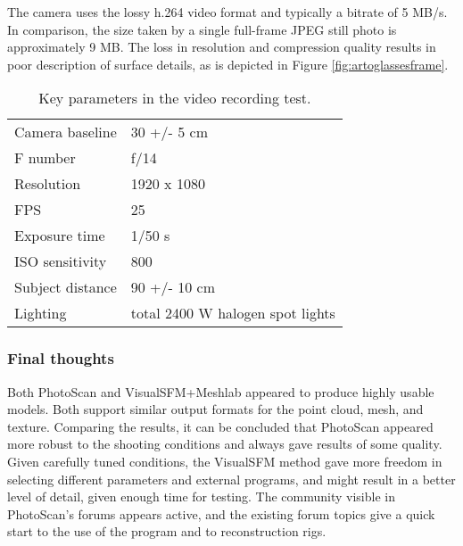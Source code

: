 The camera uses the lossy h.264 video format and typically a bitrate of 5 MB/s.
In comparison, the size taken by a single full-frame JPEG still photo is approximately 9 MB.
The loss in resolution and compression quality results in poor description of surface details, as is depicted in Figure \ref{fig:artoglassesframe}.

\begin{table}[t]
	\centering
	\begin{tabular}{l l}
		Camera baseline & 30 +/- 5 cm\\
		F number & f/14\\
		Resolution & 1920 x 1080\\
		FPS & 25\\
		Exposure time & 1/50 s\\
		ISO sensitivity & 800\\
		Subject distance & 90 +/- 10 cm\\
		Lighting & total 2400 W halogen spot lights\\
	\end{tabular}
	\caption{
		Key parameters in the video recording test.
	}
	\label{tab:samplevideoparams}
\end{table}




\subsubsection{Final thoughts}

Both PhotoScan and VisualSFM+Meshlab appeared to produce highly usable models.
Both support similar output formats for the point cloud, mesh, and texture.
Comparing the results, it can be concluded that PhotoScan appeared more robust to the shooting conditions and always gave results of some quality.
Given carefully tuned conditions, the VisualSFM method gave more freedom in selecting different parameters and external programs, and might result in a better level of detail, given enough time for testing.
The community visible in PhotoScan's forums \cite{agisoftforum} appears active, and the existing forum topics give a quick start to the use of the program and to reconstruction rigs.

